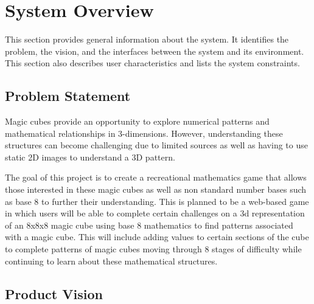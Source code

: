 \documentclass[12pt]{article}
\begin{document}
\section{System Overview}

This section provides general information about the system.  It identifies the
problem, the vision, and the interfaces between the system and its environment.
This section also describes user characteristics and lists the system
constraints.


\subsection{Problem Statement}


Magic cubes provide an opportunity to explore numerical patterns and mathematical 
relationships in 3-dimensions. However, understanding these structures can become
challenging due to limited sources as well as having to use static 2D images to understand
a 3D pattern.

The goal of this project is to create a recreational mathematics game that allows those interested
in these magic cubes as well as non standard number bases such as base 8 to further their understanding.
This is planned to be a web-based game in which users will be able to complete certain challenges on a 3d
representation of an 8x8x8 magic cube using base 8 mathematics to find patterns associated with a magic cube.
This will include adding values to certain sections of the cube to complete patterns of magic cubes moving through
8 stages of difficulty while continuing to learn about these mathematical structures.

\subsection{Product Vision}
\end{document}
